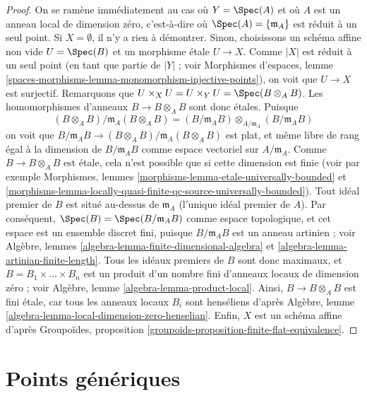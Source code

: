 \begin{proof}
On se ramène immédiatement au cas où $Y = \Spec(A)$ et où
$A$ est un anneau local de dimension zéro, c'est-à-dire où
$\Spec(A) = \{\mathfrak m_A\}$
est réduit à un seul point. Si $X = \emptyset$, il n'y a rien à démontrer.
Sinon, choisissons un schéma affine non vide $U = \Spec(B)$ et un morphisme
étale $U \to X$. Comme $|X|$ est réduit à un seul point (en tant que partie de
$|Y|$ ; voir Morphismes d'espaces, lemme
\ref{spaces-morphisms-lemma-monomorphism-injective-points}),
on voit que $U \to X$ est surjectif. Remarquons que
$U \times_X U = U \times_Y U = \Spec(B \otimes_A B)$.
Les homomorphismes d'anneaux $B \to B \otimes_A B$ sont donc étales.
Puisque
$$
(B \otimes_A B)/\mathfrak m_A(B \otimes_A B)
=
(B/\mathfrak m_AB) \otimes_{A/\mathfrak m_A} (B/\mathfrak m_AB)
$$
on voit que
$B/\mathfrak m_AB \to (B \otimes_A B)/\mathfrak m_A(B \otimes_A B)$
est plat, et même libre de rang égal à la dimension de
$B/\mathfrak m_AB$ comme espace vectoriel sur $A/\mathfrak m_A$. Comme
$B \to B \otimes_A B$ est étale, cela n'est possible que si cette dimension
est finie (voir par exemple
Morphismes, lemmes \ref{morphisms-lemma-etale-universally-bounded} et
\ref{morphisms-lemma-locally-quasi-finite-qc-source-universally-bounded}).
Tout idéal premier de $B$ est situé au-dessus de $\mathfrak m_A$ (l'unique
idéal premier de $A$). Par conséquent,
$\Spec(B) = \Spec(B/\mathfrak m_A B)$ comme espace topologique, et cet espace
est un ensemble discret fini, puisque $B/\mathfrak m_A B$ est un anneau
artinien ; voir
Algèbre, lemmes \ref{algebra-lemma-finite-dimensional-algebra} et
\ref{algebra-lemma-artinian-finite-length}.
Tous les idéaux premiers de $B$ sont donc maximaux, et
$B = B_1 \times \ldots \times B_n$ est un produit d'un nombre fini d'anneaux
locaux de dimension zéro ; voir
Algèbre, lemme \ref{algebra-lemma-product-local}.
Ainsi, $B \to B \otimes_A B$ est fini étale, car tous les anneaux locaux
$B_i$ sont henséliens d'après
Algèbre, lemme \ref{algebra-lemma-local-dimension-zero-henselian}.
Enfin, $X$ est un schéma affine d'après
Groupoïdes, proposition \ref{groupoids-proposition-finite-flat-equivalence}.
\end{proof}








\section{Points génériques}
\label{section-generic-points}

